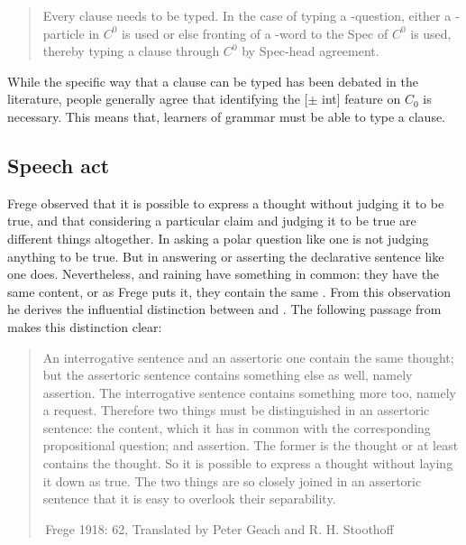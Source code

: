 \begin{quote}
Every clause needs to be typed. In the case of typing a \twh-question, either a \twh-particle in $C^{0}$ is used or else fronting of a \twh-word to the Spec of $C^{0}$ is used, thereby typing a clause through $C^{0}$ by Spec-head agreement. \hfill \textcite[p.9]{cheng1991}

\end{quote}

While the specific way that a clause can be typed has been debated in the literature, people generally agree that identifying the [$\pm$ int] feature on $C_{0}$ is necessary. This means that, learners of grammar must be able to type a clause. %


\subsection{Speech act} \label{sec:bg:theory:speech}
Frege observed that it is possible to express a thought without judging it to be true, and that considering a particular claim and judging it to be true are different things altogether. In asking a polar question like one is not judging anything to be true. But in answering or asserting the declarative sentence like  one does. Nevertheless,  and  raining have something in common: they have the same content, or as Frege puts it, they contain the same . From this observation he derives the influential distinction between  and . The following passage from  makes this distinction clear:

\begin{quote}
    

An interrogative sentence and an assertoric one contain the same thought; but the assertoric sentence contains something else as well, namely assertion. The interrogative sentence contains something more too, namely a request. Therefore two things must be distinguished in an assertoric sentence: the content, which it has in common with the corresponding propositional question; and assertion. The former is the thought or at least contains the thought. So it is possible to express a thought without laying it down as true. The two things are so closely joined in an assertoric sentence that it is easy to overlook their separability. 

$\,$\hfill Frege 1918: 62, Translated by Peter Geach and R. H. Stoothoff
\end{quote}

